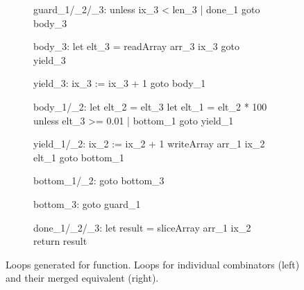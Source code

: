 \documentclass[preamble.tex]{subfiles}
\begin{document}
\begin{figure}
\begin{subfigure}{.55\textwidth}
\begin{loopcode}[%
    literate=
        {_1}{{\sub{map}}}3  %
        {_2}{{\sub{filt}}}2 %
        {_3}{{\sub{mfst}}}3 %
]
guard_1/_2/_3:
  unless ix_3 < len_3 | done_1
  goto body_3

body_3:
  let elt_3 = readArray arr_3 ix_3
  goto yield_3

yield_3:
  ix_3 := ix_3 + 1
  goto body_1



body_1/_2:
  let elt_2 = elt_3
  let elt_1 = elt_2 * 100
  unless elt_3 >= 0.01 | bottom_1
  goto yield_1

yield_1/_2:
  ix_2 := ix_2 + 1
  writeArray arr_1 ix_2 elt_1
  goto bottom_1

bottom_1/_2:
  goto bottom_3



bottom_3:
  goto guard_1

done_1/_2/_3:
  let result = sliceArray arr_1 ix_2
  return result
\end{loopcode}
\end{subfigure}
\caption{Loops generated for  function. Loops for individual combinators (left) and their merged equivalent (right).}
\label{fig:toPercentages-loops}
\end{figure}
\end{document}
